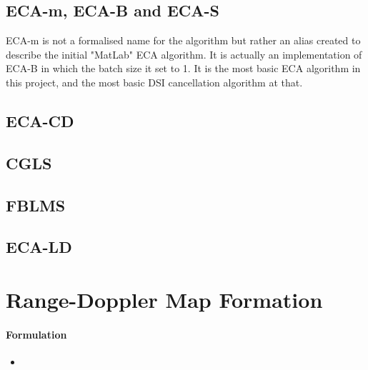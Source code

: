 \subsection{ECA-m, ECA-B and ECA-S}
\label{subsec:ch4.dsi.ecab}

ECA-m is not a formalised name for the algorithm but rather an alias created to describe the initial "MatLab" ECA algorithm. It is actually an implementation of ECA-B in which the batch size it set to 1. It is the most basic ECA algorithm in this project, and the most basic DSI cancellation algorithm at that.

\todo{}

\subsection{ECA-CD}
\label{subsec:ch4.dsi.ecacd}
\todo{}

\subsection{CGLS}
\label{subsec:ch4.dsi.cgls}
\todo{}

\subsection{FBLMS}
\label{subsec:ch4.dsi.fblms}
\todo{}

\subsection{ECA-LD}
\label{subsec:ch4.dsi.ecald}
\todo{}

\section{Range-Doppler Map Formation}
\label{sec:ch4.ard}

\paragraph{Formulation}
\begin{itemize}
    \item {}
\end{itemize}


